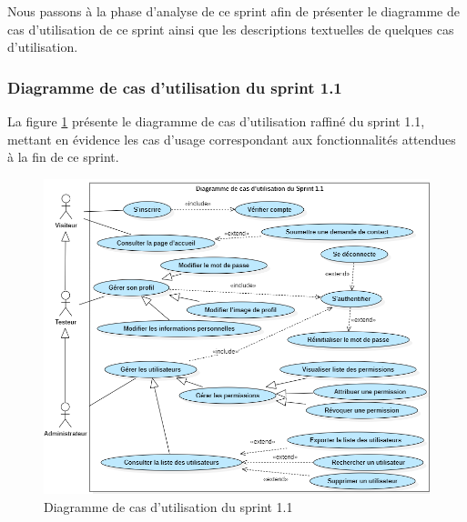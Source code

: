 Nous passons à la phase d’analyse de ce sprint afin de présenter le diagramme de cas d’utilisation de ce sprint ainsi que les descriptions textuelles de quelques cas d’utilisation. 
\subsubsection{Diagramme de cas d’utilisation du sprint 1.1}
La figure \ref{fig:caseS1} présente le diagramme de cas d’utilisation raffiné du sprint 1.1, mettant en évidence les cas d’usage correspondant aux fonctionnalités attendues à la fin de ce sprint.
\begin{figure}[H]
    \centering
    \includegraphics[width=0.92\linewidth]{chapitres/ch3Sp1/section/sprint1/img/LastUseCaseSprint1.1.png}
    \caption{Diagramme de cas d’utilisation du sprint 1.1}
    \label{fig:caseS1}
\end{figure}
\vspace{-0.5cm}
